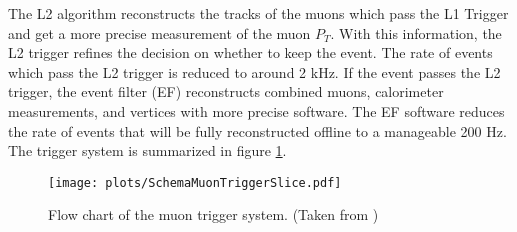 \indent The L2 algorithm reconstructs the tracks of the muons which pass the L1 Trigger and get a more precise measurement of the muon $P_T$. With this information, the L2 trigger refines the decision on whether to keep the event. The rate of events which pass the L2 trigger is reduced to around 2 kHz. If the event passes the L2 trigger, the event filter (EF) reconstructs combined muons, calorimeter measurements, and vertices with more precise software. The EF software reduces the rate of events that will be fully reconstructed offline to a manageable 200 Hz. The trigger system is summarized in figure \ref{LHC:fig:MuonTrigFlow}. ~\\
\begin{figure}[h!]
\centering
\texttt{[image: plots/SchemaMuonTriggerSlice.pdf]}
\caption{ Flow chart of the muon trigger system. (Taken from \cite{biblio:TriggerTwiki}) \label{LHC:fig:MuonTrigFlow}}
\end{figure}

